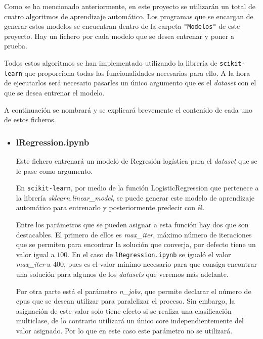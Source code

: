\documentclass[a4paper, 12pt]{book}
\begin{document}
Como se ha mencionado anteriormente, en este proyecto se utilizarán un total de cuatro algoritmos de aprendizaje automático. Los programas que se encargan de generar estos modelos se encuentran dentro de la carpeta \texttt{"Modelos"} de este proyecto. Hay un fichero por cada modelo que se desea entrenar y poner a prueba.

Todos estos algoritmos se han implementado utilizando la librería de \texttt{scikit-learn} que proporciona todas las funcionalidades necesarias para ello. A la hora de ejecutarlos será necesario pasarles un único argumento que es el \textit{dataset} con el que se desea entrenar el modelo.

A continuación se nombrará y se explicará brevemente el contenido de cada uno de estos ficheros.

\begin{itemize}

\item \subsubsection{lRegression.ipynb}
\label{subsubsec:lRegression}

Este fichero entrenará un modelo de Regresión logística para el \textit{dataset} que se le pase como argumento.

En \texttt{scikit-learn}, por medio de la función LogisticRegression\cite{LogisticRegressionDoc} que pertenece a la librería \textit{sklearn.linear\_model}, se puede generar este modelo de aprendizaje automático para entrenarlo y posteriormente predecir con él. 

Entre los parámetros que se pueden asignar a esta función hay dos que son destacables. El primero de ellos es \textit{max\_iter}, máximo número de iteraciones que se permiten para encontrar la solución que converja, por defecto tiene un valor igual a $100$. En el caso de \texttt{lRegression.ipynb} se igualó el valor \textit{max\_iter} a $400$, pues es el valor mínimo necesario para que consiga encontrar una solución para algunos de los \textit{datasets} que veremos más adelante.

Por otra parte está el parámetro \textit{n\_jobs}, que permite declarar el número de cpus que se desean utilizar para paralelizar el proceso. Sin embargo, la asignación de este valor solo tiene efecto si se realiza una clasificación multiclase, de lo contrario utilizará un único core independientemente del valor asignado. Por lo que en este caso este parámetro no se utilizará.


\end{itemize}
\end{document}
